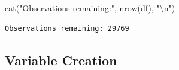 \documentclass[
  11pt,
]{article}
\newenvironment{Shaded}{\begin{snugshade}}{\end{snugshade}}
\newcommand{\FunctionTok}[1]{\textcolor[rgb]{0.28,0.35,0.67}{#1}}
\newcommand{\NormalTok}[1]{\textcolor[rgb]{0.00,0.23,0.31}{#1}}
\newcommand{\SpecialCharTok}[1]{\textcolor[rgb]{0.37,0.37,0.37}{#1}}
\newcommand{\StringTok}[1]{\textcolor[rgb]{0.13,0.47,0.30}{#1}}
\begin{document}
\begin{Shaded}
\begin{Highlighting}[]
\FunctionTok{cat}\NormalTok{(}\StringTok{"Observations remaining:"}\NormalTok{, }\FunctionTok{nrow}\NormalTok{(df), }\StringTok{"}\SpecialCharTok{\textbackslash{}n}\StringTok{"}\NormalTok{)}
\end{Highlighting}
\end{Shaded}

\begin{verbatim}
Observations remaining: 29769 
\end{verbatim}

\subsection{Variable Creation}\label{variable-creation}
\end{document}
